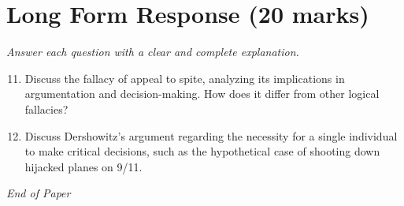 \documentclass[12pt]{article}
\begin{document}
\section*{Long Form Response (20 marks)}
\textit{Answer each question with a clear and complete explanation.}
\begin{enumerate}[label=\arabic*.]
\setcounter{enumi}{10}
\item Discuss the fallacy of appeal to spite, analyzing its implications in argumentation and decision-making. How does it differ from other logical fallacies?
\item Discuss Dershowitz's argument regarding the necessity for a single individual to make critical decisions, such as the hypothetical case of shooting down hijacked planes on 9/11.
\end{enumerate}

\vfill
\noindent\textit{End of Paper}
\end{document}
